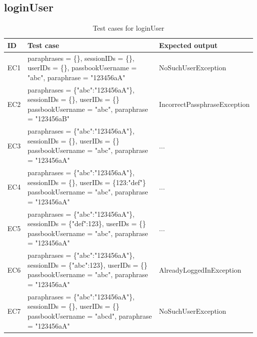 \documentclass{article}
\begin{document}
\subsection{loginUser}

\begin{longtable}{|p{2cm}|p{7cm}|p{5cm}|}
\caption{Test cases for loginUser}\\
\hline 
ID&Test case&Expected output\\
\hline  
EC1&paraphrases = \{\}, sessionIDs = \{\}, userIDs = \{\}, passbookUsername = "abc", paraphrase = "123456aA"&NoSuchUserException\\
\hline
EC2&paraphrases = \{"abc":"123456aA"\}, sessionIDs = \{\}, userIDs = \{\} passbookUsername = "abc", paraphrase = "123456aB"&IncorrectPassphraseException\\
\hline
EC3&paraphrases = \{"abc":"123456aA"\}, sessionIDs = \{\}, userIDs = \{\} passbookUsername = "abc", paraphrase = "123456aA"&...\\
\hline
EC4&paraphrases = \{"abc":"123456aA"\}, sessionIDs = \{\}, userIDs = \{123:"def"\} passbookUsername = "abc", paraphrase = "123456aA"&...\\
\hline
EC5&paraphrases = \{"abc":"123456aA"\}, sessionIDs = \{"def":123\}, userIDs = \{\} passbookUsername = "abc", paraphrase = "123456aA"&...\\
\hline
EC6&paraphrases = \{"abc":"123456aA"\}, sessionIDs = \{"abc":123\}, userIDs = \{\} passbookUsername = "abc", paraphrase = "123456aA"&AlreadyLoggedInException\\
\hline
EC7&paraphrases = \{"abc":"123456aA"\}, sessionIDs = \{\}, userIDs = \{\} passbookUsername = "abcd", paraphrase = "123456aA"&NoSuchUserException\\
\hline
\end{longtable}
\end{document}

